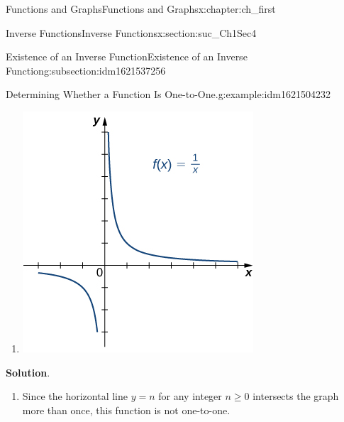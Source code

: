 \documentclass[oneside,10pt,]{book}
\newcommand{\blocktitlefont}{\relax}
\numberwithin{equation}{section}
\begin{document}
\begin{chapterptx}{Functions and Graphs}{}{Functions and Graphs}{}{}{x:chapter:ch_first}
\begin{sectionptx}{Inverse Functions}{}{Inverse Functions}{}{}{x:section:suc_Ch1Sec4}
\begin{subsectionptx}{Existence of an Inverse Function}{}{Existence of an Inverse Function}{}{}{g:subsection:idm1621537256}
\begin{example}{Determining Whether a Function Is One-to-One.}{g:example:idm1621504232}
\begin{enumerate}
\begin{image}{0.25}{0.5}{0.25}
\end{image}%
%
\item{}\begin{image}{0.25}{0.5}{0.25}%
\includegraphics[width=\linewidth]{external/CNX_Calc_Figure_01_04_004.jpg}
\end{image}%
%
\end{enumerate}
\par\smallskip%
\noindent\textbf{\blocktitlefont Solution}.\hypertarget{g:solution:idm1621505512}{}\quad{}%
\begin{enumerate}
\item{}Since the horizontal line \(y=n\) for any integer \(n\geq 0\) intersects the graph more than once, this function is not one-to-one. \begin{image}{0.25}{0.5}{0.25}%

\end{image}
\end{enumerate}
\end{example}
\end{subsectionptx}
\end{sectionptx}
\end{chapterptx}
\end{document}
